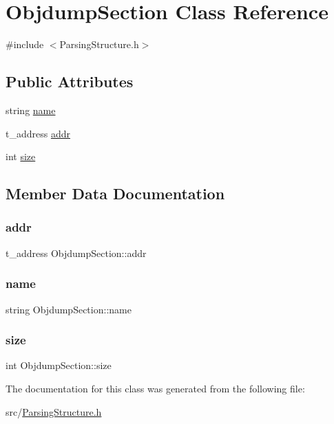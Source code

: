 \hypertarget{classObjdumpSection}{}\section{Objdump\+Section Class Reference}
\label{classObjdumpSection}


{\ttfamily \#include $<$Parsing\+Structure.\+h$>$}

\subsection*{Public Attributes}
\begin{DoxyCompactItemize}
\item 
string \hyperlink{classObjdumpSection_a5798e7748cf015c1e583f70123d974cb}{name}
\item 
t\+\_\+address \hyperlink{classObjdumpSection_aed2bc15f39c0ff267808a3e39045c078}{addr}
\item 
int \hyperlink{classObjdumpSection_aa5e87b1c5ce9245d327c621fb07f5590}{size}
\end{DoxyCompactItemize}


\subsection{Member Data Documentation}
\mbox{\label{classObjdumpSection_aed2bc15f39c0ff267808a3e39045c078}} 
\subsubsection{\texorpdfstring{addr}{addr}}
{\footnotesize\ttfamily t\+\_\+address Objdump\+Section\+::addr}

\mbox{\label{classObjdumpSection_a5798e7748cf015c1e583f70123d974cb}} 
\subsubsection{\texorpdfstring{name}{name}}
{\footnotesize\ttfamily string Objdump\+Section\+::name}

\mbox{\label{classObjdumpSection_aa5e87b1c5ce9245d327c621fb07f5590}} 
\subsubsection{\texorpdfstring{size}{size}}
{\footnotesize\ttfamily int Objdump\+Section\+::size}



The documentation for this class was generated from the following file\+:\begin{DoxyCompactItemize}
\item 
src/\hyperlink{ParsingStructure_8h}{Parsing\+Structure.\+h}\end{DoxyCompactItemize}
